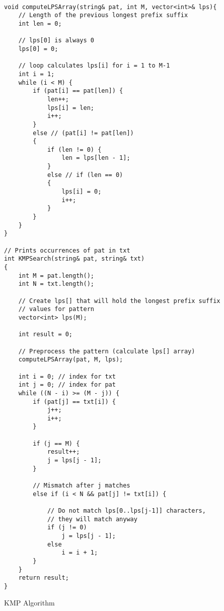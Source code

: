 \documentclass{article}
\begin{document}
\begin{lstlisting}

void computeLPSArray(string& pat, int M, vector<int>& lps){
    // Length of the previous longest prefix suffix
    int len = 0;

    // lps[0] is always 0
    lps[0] = 0;

    // loop calculates lps[i] for i = 1 to M-1
    int i = 1;
    while (i < M) {
        if (pat[i] == pat[len]) {
            len++;
            lps[i] = len;
            i++;
        }
        else // (pat[i] != pat[len])
        {
            if (len != 0) {
                len = lps[len - 1];
            }
            else // if (len == 0)
            {
                lps[i] = 0;
                i++;
            }
        }
    }
}

// Prints occurrences of pat in txt
int KMPSearch(string& pat, string& txt)
{
    int M = pat.length();
    int N = txt.length();

    // Create lps[] that will hold the longest prefix suffix
    // values for pattern
    vector<int> lps(M);

    int result = 0;

    // Preprocess the pattern (calculate lps[] array)
    computeLPSArray(pat, M, lps);

    int i = 0; // index for txt
    int j = 0; // index for pat
    while ((N - i) >= (M - j)) {
        if (pat[j] == txt[i]) {
            j++;
            i++;
        }

        if (j == M) {
            result++;
            j = lps[j - 1];
        }

        // Mismatch after j matches
        else if (i < N && pat[j] != txt[i]) {

            // Do not match lps[0..lps[j-1]] characters,
            // they will match anyway
            if (j != 0)
                j = lps[j - 1];
            else
                i = i + 1;
        }
    }
    return result;
}
\end{lstlisting}
KMP Algorithm
\end{document}
